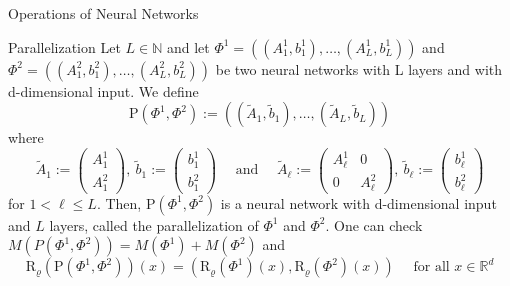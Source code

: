 \documentclass{if-beamer}
\begin{document}
\begin{frame}{Operations of Neural Networks}
    
    \begin{block}{Parallelization}
        {\small
        Let $L \in \mathbb{N}$ and let $\Phi^{1}=\left(\left(A_{1}^{1}, b_{1}^{1}\right), \ldots,\left(A_{L}^{1}, b_{L}^{1}\right)\right)$ and $\Phi^{2}=\left(\left(A_{1}^{2}, b_{1}^{2}\right), \ldots,\left(A_{L}^{2}, b_{L}^{2}\right)\right)$ be
        two neural networks with L layers and with d-dimensional input. We define
        \[
        \mathrm{P}\left(\Phi^{1}, \Phi^{2}\right):=\left(\left(\widetilde{A}_{1}, \widetilde{b}_{1}\right), \ldots,\left(\widetilde{A}_{L}, \widetilde{b}_{L}\right)\right)
        \]
        where
        {\small
        \[
        \widetilde{A}_{1}:=\left(\begin{array}{c}
        A_{1}^{1} \\
        A_{1}^{2}
        \end{array}\right),\: \tilde{b}_{1}:=\left(\begin{array}{c}
        b_{1}^{1} \\
        b_{1}^{2}
        \end{array}\right) \quad \text { and } \quad \widetilde{A}_{\ell}:=\left(\begin{array}{cc}
        A_{\ell}^{1} & 0 \\
        0 & A_{\ell}^{2}
        \end{array}\right),\: \tilde{b}_{\ell}:=\left(\begin{array}{c}
        b_{\ell}^{1} \\
        b_{\ell}^{2}
        \end{array}\right)
        \]
        }
        for $ 1<\ell \leq L$. Then, $\mathrm{P}\left(\Phi^{1}, \Phi^{2}\right)$ is a neural network with d-dimensional input and $L$ layers, called the parallelization of
        $\Phi^{1}$ and $\Phi^{2}$.
        One can check $M\left(P\left(\Phi^{1}, \Phi^{2}\right)\right)=M\left(\Phi^{1}\right)+M\left(\Phi^{2}\right)$ and
        \[
        \mathrm{R}_{\varrho}\left(\mathrm{P}\left(\Phi^{1}, \Phi^{2}\right)\right)(x)=\left(\mathrm{R}_{\varrho}\left(\Phi^{1}\right)(x), \mathrm{R}_{\varrho}\left(\Phi^{2}\right)(x)\right) \quad \text { for all } x \in \mathbb{R}^{d}
        \]
    }
    \end{block}
    
    
\end{frame}
\end{document}
